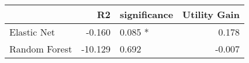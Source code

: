 \begin{tabular}{lrlr}
\toprule
{} &      R2 & significance &  Utility Gain \\
\midrule
Elastic Net   &  -0.160 &      0.085 * &         0.178 \\
Random Forest & -10.129 &       0.692  &        -0.007 \\
\bottomrule
\end{tabular}
